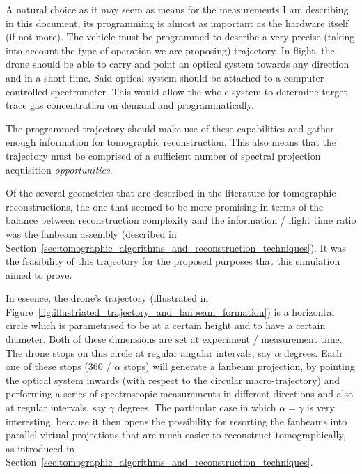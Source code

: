 A natural choice as it may seem as means for the measurements I am
describing in this document, its programming is almost  as important as
the hardware itself (if not more). The vehicle must be programmed to
describe a very precise (taking into account the type of operation we
are proposing) trajectory. In flight, the drone should be able to carry
and point an optical system towards any direction and in a short time.
Said optical system should be attached to a computer-controlled
spectrometer. This would allow the whole system to determine target
trace gas concentration on demand and programmatically.

The programmed trajectory should make use of these capabilities and
gather enough information for tomographic reconstruction. This also
means that the trajectory must be comprised of a sufficient number of
spectral projection acquisition \emph{opportunities}.

Of the several geometries that are described in the literature for
tomographic reconstructions, the one that seemed to be more promising in
terms of the balance between reconstruction complexity and the
information / flight time ratio was the fanbeam assembly (described in
Section~\ref{sec:tomographic_algorithms_and_reconstruction_techniques}).
It was the feasibility of this trajectory for the proposed purposes that
this simulation aimed to prove.

In essence, the drone's trajectory (illustrated in
Figure~\ref{fig:illustriated_trajectory_and_fanbeam_formation}) is a
horizontal circle which is parametrised to be at a certain height and to
have a certain diameter.  Both of these dimensions are set at experiment
/ measurement time. The drone stops on this circle at regular angular
intervals, say $\alpha$ degrees. Each one of these stops (360 / $\alpha$
stops) will generate a fanbeam projection, by pointing the optical
system inwards (with respect to the circular macro-trajectory) and
performing a series of spectroscopic measurements in different
directions and also at regular intervals, say $\gamma$ degrees. The
particular case in which $\alpha = \gamma$ is very interesting, because
it then opens the possibility for resorting the fanbeams into parallel
virtual-projections that are much easier to reconstruct tomographically,
as introduced in
Section~\ref{sec:tomographic_algorithms_and_reconstruction_techniques}.  

